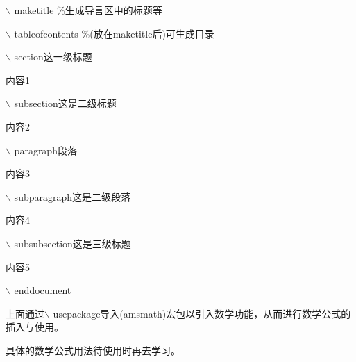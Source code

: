 \documentclass[UTF8]{ctexart}
\begin{document}
$\backslash$ maketitle \%生成导言区中的标题等

$\backslash$ tableofcontents \%(放在maketitle后)可生成目录

$\backslash$ section{这一级标题}

内容1

$\backslash$ subsection{这是二级标题}

内容2

$\backslash$ paragraph{段落}

内容3

$\backslash$ subparagraph{这是二级段落}

内容4

$\backslash$ subsubsection{这是三级标题}

内容5

$\backslash$ end{document}

上面通过$\backslash$ usepackage导入(amsmath)宏包以引入数学功能，从而进行数学公式的插入与使用。

具体的数学公式用法待使用时再去学习。
\end{document}
